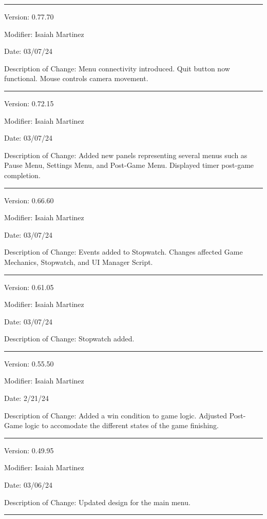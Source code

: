 \documentclass[a4paper,10pt]{article}
\begin{document}
    \noindent\rule{12cm}{0.4pt}

    Version: 0.77.70

    Modifier: Isaiah Martinez
    
    Date: 03/07/24
    
    Description of Change: Menu connectivity introduced.
    Quit button now functional.
    Mouse controls camera movement.
 
    \noindent\rule{12cm}{0.4pt}

    Version: 0.72.15

    Modifier: Isaiah Martinez
    
    Date: 03/07/24
    
    Description of Change: Added new panels representing several menus such as Pause Menu, Settings Menu, and Post-Game Menu.
    Displayed timer post-game completion.
 
    \noindent\rule{12cm}{0.4pt}

    Version: 0.66.60

    Modifier: Isaiah Martinez
    
    Date: 03/07/24
    
    Description of Change: Events added to Stopwatch.
    Changes affected Game Mechanics, Stopwatch, and UI Manager Script.
 
    \noindent\rule{12cm}{0.4pt}

    Version: 0.61.05

    Modifier: Isaiah Martinez
    
    Date: 03/07/24
    
    Description of Change: Stopwatch added.
 
    \noindent\rule{12cm}{0.4pt}

    Version: 0.55.50

    Modifier: Isaiah Martinez
    
    Date: 2/21/24
    
    Description of Change: Added a win condition to game logic.
    Adjusted Post-Game logic to accomodate the different states of the game finishing.
 
    \noindent\rule{12cm}{0.4pt}

    Version: 0.49.95

    Modifier: Isaiah Martinez
    
    Date: 03/06/24
    
    Description of Change: Updated design for the main menu.
 
    \noindent\rule{12cm}{0.4pt}
\end{document}
